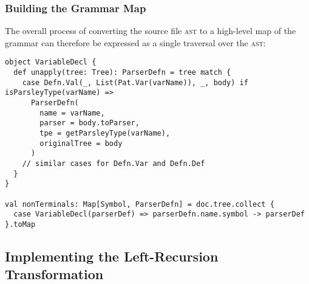 \documentclass[../../main.tex]{subfiles}
\begin{document}
\subsubsection{Building the Grammar Map}
The overall process of converting the source file \textsc{ast} to a high-level map of the grammar can therefore be expressed as a single traversal over the \textsc{ast}:
\begin{verbatim}
object VariableDecl {
  def unapply(tree: Tree): ParserDefn = tree match {
    case Defn.Val(_, List(Pat.Var(varName)), _, body) if isParsleyType(varName) =>
      ParserDefn(
        name = varName,
        parser = body.toParser,
        tpe = getParsleyType(varName),
        originalTree = body
      )
    // similar cases for Defn.Var and Defn.Def
  }
}

val nonTerminals: Map[Symbol, ParserDefn] = doc.tree.collect {
  case VariableDecl(parserDef) => parserDefn.name.symbol -> parserDef
}.toMap
\end{verbatim}

\subsection{Implementing the Left-Recursion Transformation}
\end{document}
